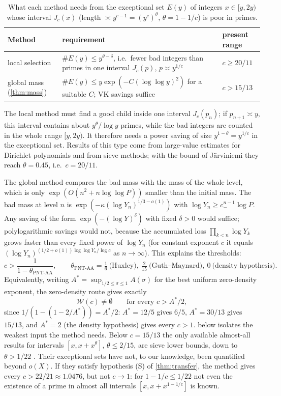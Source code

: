 \documentclass[11pt,a4paper]{article}
\theoremstyle{definition}
\newcommand{\W}{\mathcal{W}}
\begin{document}
\begin{table}[ht]
\centering\small
\caption{What each method needs from the exceptional set $E(y)$ of integers $x\in[y,2y)$ whose interval
$J_c(x)$ (length $\asymp y^{c-1}=(y^c)^{\theta}$, $\theta=1-1/c$) is poor in primes.}
\label{tab:compare}
\begin{tabularx}{\linewidth}{@{}lXl@{}}
\toprule
Method & requirement & present range\\
\midrule
local selection \cite{Mat10,Jar22} & $\#E(y)\le y^{\theta-\delta}$, i.e.\ fewer bad integers than primes in one interval $J_c(p)$, $p\asymp y^{1/c}$ & $c\ge20/11$\\
global mass (\cref{thm:mass}) & $\#E(y)\le y\exp(-C(\log\log y)^2)$ for a suitable $C$; VK savings suffice & $c>15/13$\\
\bottomrule
\end{tabularx}
\end{table}

The local method must find a good child inside one interval $J_c(p_n)$; if $p_{n+1}\asymp y$, this interval
contains about $y^{\theta}/\log y$ primes, while the bad integers are counted in the whole range $[y,2y)$.
It therefore needs a power saving of size $y^{1-\theta}=y^{1/c}$ in the exceptional set. Results of this
type come from large-value estimates for Dirichlet polynomials and from sieve methods; with the
bound of Järviniemi \cite{Jar22} they reach $\theta=0.45$, i.e.\ $c=20/11$.

The global method compares the bad mass with the mass of the whole level, which is only
$\exp(O(n^2+n\log\log P))$ smaller than the initial mass. The bad mass at level $n$ is
$\exp(-\kappa(\log Y_n)^{1/3-o(1)})$ with $\log Y_n\ge c_-^{n-1}\log P$. Any saving of the form
$\exp(-(\log Y)^{\delta})$ with fixed $\delta>0$ would suffice; polylogarithmic savings would not, because the accumulated loss
$\prod_{k<n}\log Y_k$ grows faster than every fixed power of $\log Y_n$ (for constant exponent $c$ it equals
$(\log Y_n)^{(1/2+o(1))\log\log Y_n/\log c}$ as $n\to\infty$). This explains the thresholds:
\[
 c>\frac{1}{1-\theta_{\mathrm{PNT}\text{-}\mathrm{AA}}},\qquad \theta_{\mathrm{PNT}\text{-}\mathrm{AA}}=\tfrac16\ \text{(Huxley)},\ \tfrac2{15}\ \text{(Guth--Maynard)},\ 0\ \text{(density hypothesis)}.
\]
Equivalently, writing $A^*=\sup_{1/2\le\sigma\le1}A(\sigma)$ for the best uniform zero-density exponent,
the zero-density route gives exactly
\[
 \W(c)\neq\emptyset\qquad\text{for every } c>A^*/2 ,
\]
since $1/(1-(1-2/A^*))=A^*/2$: $A^*=12/5$ gives $6/5$, $A^*=30/13$ gives $15/13$, and $A^*=2$ (the density
hypothesis) gives every $c>1$.  below isolates the weakest input the method needs.
Below $c=15/13$ the only available almost-all results for intervals $[x,x+x^\theta]$, $\theta\le2/15$, are sieve
lower bounds, down to $\theta>1/22$ \cite{Li24,Li25b}. Their exceptional sets have not, to our knowledge, been
quantified beyond $o(X)$. If they satisfy hypothesis (S) of \cref{thm:transfer}, the method gives every
$c>22/21\approx1.0476$, but not $c\to1$: for $1-1/c\le1/22$ not even the existence of a prime in almost all
intervals $[x,x+x^{1-1/c}]$ is known.
\end{document}
